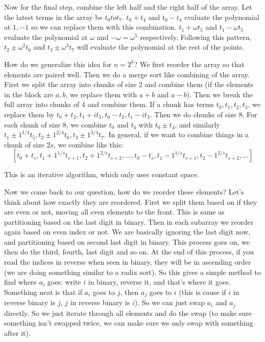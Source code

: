 \documentclass[12pt]{report}
\begin{document}
\begin{enumerate}[label=\textbf{\arabic*.}]
    Now for the final step, combine the left half and the right half of the array. Let the latest terms in the array be $t_0 to t_7$. $t_0 + t_4$ and 
    $t_0 - t_4$ evaluate the polynomial at $1, -1$ so we can replace them with this combination. $t_1 + \omega t_5$ and $t_1 - \omega t_5$ evaluate the 
    polynomial at $\omega$ and $-\omega = \omega^5$ respectively. Following this pattern, $t_2 \pm \omega^2 t_6$ and $t_3 \pm \omega^3 t_7$ will evaluate
    the polynomial at the rest of the points.
    
    How do we generalize this idea for $n = 2^k$? We first reorder the array so that elements are paired well. Then we do a merge sort like combining of the 
    array. First we split the array into chunks of size 2 and combine them (if the elements in the block are $a, b$, we replace them with $a+b$ and $a-b$).
    Then we break the full array into chunks of 4 and combine them. If a chunk has terms $t_0, t_1, t_2, t_3$, we replace them by $t_0 + t_2, t_1 + i t_3, 
    t_0 - t_2, t_1 - i t_3$. Then we do chunks of size 8. For each chunk of size 8, we combine $t_0$ and $t_4$ with $t_0 \pm t_4$, and similarly
    $t_1 \pm 1^{1/4} t_5, t_2 \pm 1^{2/4} t_6, t_3 \pm 1^{3/4} t_7$. In general, if we want to combine things in a chunk of size $2s$, we combine like this: 
    \[ [t_0 + t_{s}, t_1 + 1^{1/s} t_{s+1}, t_2 + 1^{2/s} t_{s+2}, \dots, t_0 - t_{s}, t_1 - 1^{1/s} t_{s+1}, t_2 - 1^{2/s} t_{s+2}, \dots] \]

    This is an iterative algorithm, which only uses constant space.

    Now we come back to our question, how do we reorder these elements? Let's think about how exactly they are reordered. First we split them based on if they 
    are even or not, moving all even elements to the front. This is same as partitioning based on the last digit in binary. Then in each subarray we reorder again
    based on even index or not. We are basically ignoring the last digit now, and partitioning based on second last digit in binary. This process goes on, we then 
    do the third, fourth, last digit and so on. At the end of this process, if you read the indices in reverse when seen in binary, they will be in ascending order 
    (we are doing something similar to a radix sort). So this gives a simple method to find where $a_i$ goes: write $i$ in binary, reverse it, and that's where it 
    goes. Something neat is that if $a_i$ goes to $j$, then $a_j$ goes to $i$ (this is cause if $i$ in reverse binary is $j$, $j$ in reverse binary is $i$). So 
    we can just swap $a_i$ and $a_j$ directly. So we just iterate through all elements and do the swap (to make sure something isn't swapped twice, we can make sure
    we only swap with something after it).

    
\end{enumerate}
\end{document}
